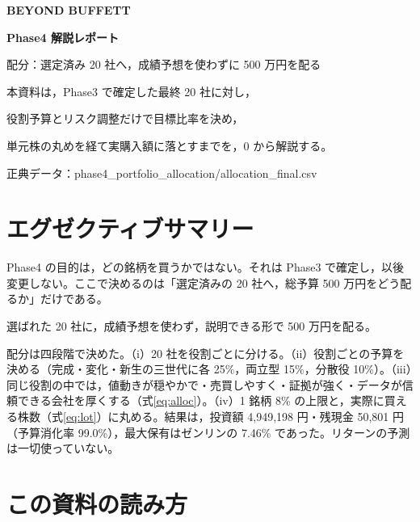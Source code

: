 \documentclass[a4paper,10pt]{article}
\begin{document}
\begin{titlepage}
\centering
\vspace*{12mm}
{\sffamily\bfseries\Huge BEYOND BUFFETT\par}
\vspace{6mm}
{\sffamily\bfseries\LARGE Phase4 解説レポート\par}
\vspace{3mm}
{\sffamily\Large 配分：選定済み 20 社へ，成績予想を使わずに 500 万円を配る\par}
\vspace{14mm}
{\large 本資料は，Phase3 で確定した最終 20 社に対し，\par}
{\large 役割予算とリスク調整だけで目標比率を決め，\par}
{\large 単元株の丸めを経て実購入額に落とすまでを，0 から解説する。\par}
\vfill
{\small 正典データ：phase4\_portfolio\_allocation/allocation\_final.csv\par}
\end{titlepage}

\setcounter{tocdepth}{2}
\tableofcontents
\clearpage

\section{エグゼクティブサマリー}

Phase4 の目的は，どの銘柄を買うかではない。それは Phase3 で確定し，以後変更しない。ここで決めるのは「選定済みの 20 社へ，総予算 500 万円をどう配るか」だけである。

\begin{keybox}
\centering
\Large 選ばれた 20 社に，成績予想を使わず，説明できる形で 500 万円を配る。
\end{keybox}

配分は四段階で決めた。（i）20 社を役割ごとに分ける。（ii）役割ごとの予算を決める（完成・変化・新生の三世代に各 25\%，両立型 15\%，分散役 10\%）。（iii）同じ役割の中では，値動きが穏やかで・売買しやすく・証拠が強く・データが信頼できる会社を厚くする（式\eqref{eq:alloc}）。（iv）1 銘柄 8\% の上限と，実際に買える株数（式\eqref{eq:lot}）に丸める。結果は，投資額 4{,}949{,}198 円・残現金 50{,}801 円（予算消化率 99.0\%），最大保有はゼンリンの 7.46\% であった。リターンの予測は一切使っていない。

\section{この資料の読み方}
\end{document}
